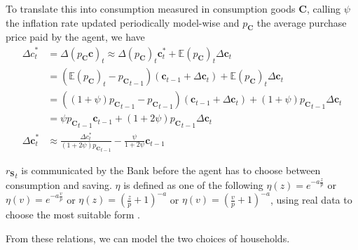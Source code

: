 \documentclass[a4paper, headings=standardclasses]{scrartcl}
\begin{document}
To translate this into consumption measured in consumption goods $\mathbf{C}$, calling $\psi$ the inflation rate updated periodically model-wise and $p_\mathbf{C}$ the average purchase price paid by the agent, we have
\begin{align*}
	{\Delta c}^*_t          & = \Delta (p_\mathbf{C} \mathbf{c})_t \approx \Delta(p_\mathbf{C})_t \mathbf{c}^*_t + \mathbb{E}(p_\mathbf{C})_t {\Delta \mathbf{c}}_t                   \\
	                        & = (\mathbb{E}(p_\mathbf{C})_t - {p_\mathbf{C}}_{t-1}) (\mathbf{c}_{t-1} + {\Delta \mathbf{c}}_t) + \mathbb{E}(p_\mathbf{C})_t {\Delta \mathbf{c}}_t     \\
	                        & = ((1+\psi){p_\mathbf{C}}_{t-1} - {p_\mathbf{C}}_{t-1}) (\mathbf{c}_{t-1} + {\Delta \mathbf{c}}_t) + (1+\psi){p_\mathbf{C}}_{t-1} {\Delta \mathbf{c}}_t \\
	                        & = \psi {p_\mathbf{C}}_{t-1} \mathbf{c}_{t-1} + (1+2\psi){p_\mathbf{C}}_{t-1} {\Delta \mathbf{c}}_t                                                      \\
	{\Delta \mathbf{c}}^*_t & \approx \frac{\Delta c^*_t}{(1+2\psi){p_\mathbf{C}}_{t-1}} - \frac{\psi}{1+2\psi}{\mathbf{c}_{t-1}}
\end{align*}

${r_\mathbf{S}}_t$ is communicated by the Bank before the agent has to choose between consumption and saving. $\eta$ is defined as one of the following $\eta(z) = e^{-a\frac{z}{p}}$ or $\eta(v) = e^{-a\frac{v}{p}}$ or $\eta(z) = (\frac{z}{p} + 1)^{-a}$ or $\eta(v) = (\frac{v}{p} + 1)^{-a}$, using real data to choose the most suitable form \parencite[such as][]{fisher2020,carroll2017}.

From these relations, we can model the two choices of households.
\end{document}

